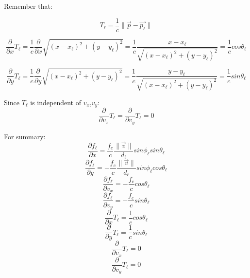 Remember that:

\begin{equation}
T_\ell=\frac{1}{c} \|\vec{p}-\vec{p_\ell}\|
\end{equation}

\begin{equation}
\frac{\partial}{\partial x} T_\ell=\frac{1}{c}  \frac{\partial}{\partial x} \sqrt{(x-x_\ell )^2+(y-y_\ell )^2}=\frac{1}{c}\frac{x-x_\ell }{\sqrt{(x-x_\ell  )^2+(y-y_\ell )^2}}=\frac{1}{c} cos\theta_\ell                                
\end{equation}

\begin{equation}
\frac{\partial} {\partial y} T_\ell =\frac{1}{c}  \frac{\partial}{\partial y} \sqrt{(x-x_\ell  )^2+(y-y_\ell  )^2}=\frac{1}{c}\frac{y-y_\ell }{\sqrt{(x-x_\ell  )^2+(y-y_\ell  )^2}}=\frac{1}{c} sin\theta_\ell                                  
\end{equation}

Since $T_\ell $ is independent of $v_x$,$v_y$:
\begin{equation}
\frac{\partial}{\partial v_x}  T_\ell =\frac{\partial}{\partial v_y}  T_\ell =0
\end{equation}

For summary:
\begin{equation}
\frac{\partial f_\ell }{\partial x}=\frac{f_c}{c} \frac{\|\vec{v}\|}{d_\ell } sin\phi_\ell  sin\theta_\ell 
\end{equation}
\begin{equation}
\frac{\partial f_\ell }{\partial y}=-\frac{f_c}{c}  \frac{\|\vec{v}\|}{d_\ell }  sin\phi_\ell  cos\theta_\ell 
\end{equation}
\begin{equation}
\frac{\partial f_\ell }{\partial v_x}=-\frac{f_c}{c} cos\theta_\ell 
\end{equation}
\begin{equation}
\frac{\partial f_\ell }{\partial v_y}=-\frac{f_c}{c} sin\theta_\ell 
\end{equation}
\begin{equation}
\frac{\partial}{\partial x} T_\ell =\frac{1}{c} cos\theta_\ell 
\end{equation}
\begin{equation}
\frac{\partial}{\partial y} T_\ell =\frac{1}{c} sin\theta_\ell 
\end{equation}
\begin{equation}
\frac{\partial}{\partial v_x}  T_\ell =0
\end{equation}
\begin{equation}
\frac{\partial}{\partial v_y}  T_\ell =0
\end{equation}


